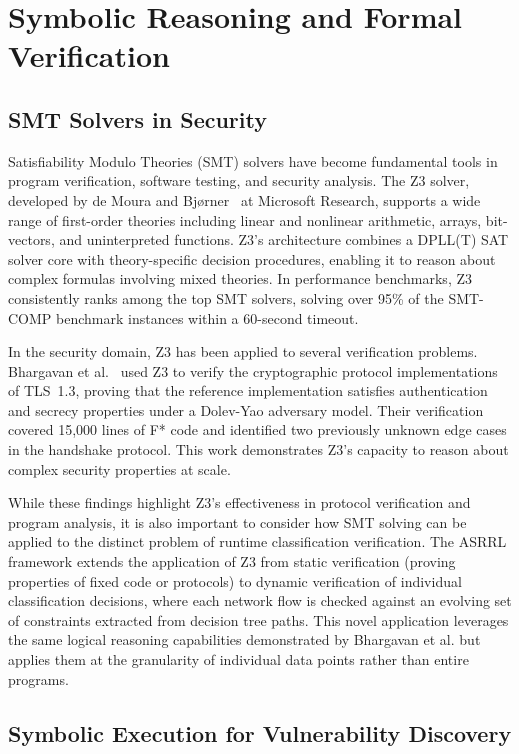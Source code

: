 \documentclass[12pt, letterpaper, oneside]{report}
\newcommand{\ASRRL}{\textsc{ASRRL}}
\begin{document}
\section{Symbolic Reasoning and Formal Verification}
\label{sec:lit_symbolic}

\subsection{SMT Solvers in Security}

Satisfiability Modulo Theories (SMT) solvers have become fundamental tools in program verification, software testing, and security analysis. The Z3 solver, developed by de Moura and Bj{\o}rner~\cite{demoura2008} at Microsoft Research, supports a wide range of first-order theories including linear and nonlinear arithmetic, arrays, bit-vectors, and uninterpreted functions. Z3's architecture combines a DPLL(T) SAT solver core with theory-specific decision procedures, enabling it to reason about complex formulas involving mixed theories. In performance benchmarks, Z3 consistently ranks among the top SMT solvers, solving over 95\% of the SMT-COMP benchmark instances within a 60-second timeout.

In the security domain, Z3 has been applied to several verification problems. Bhargavan et al.~\cite{bhargavan2017} used Z3 to verify the cryptographic protocol implementations of TLS~1.3, proving that the reference implementation satisfies authentication and secrecy properties under a Dolev-Yao adversary model. Their verification covered 15,000 lines of F* code and identified two previously unknown edge cases in the handshake protocol. This work demonstrates Z3's capacity to reason about complex security properties at scale.

While these findings highlight Z3's effectiveness in protocol verification and program analysis, it is also important to consider how SMT solving can be applied to the distinct problem of runtime classification verification. The \ASRRL{} framework extends the application of Z3 from static verification (proving properties of fixed code or protocols) to dynamic verification of individual classification decisions, where each network flow is checked against an evolving set of constraints extracted from decision tree paths. This novel application leverages the same logical reasoning capabilities demonstrated by Bhargavan et al. but applies them at the granularity of individual data points rather than entire programs.

\subsection{Symbolic Execution for Vulnerability Discovery}
\end{document}
